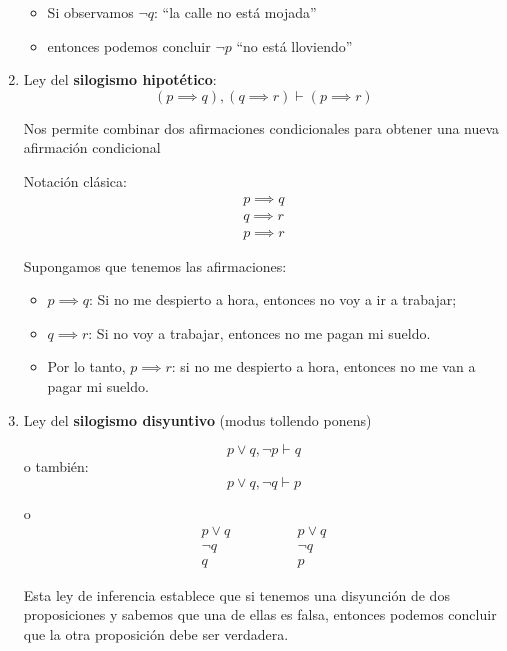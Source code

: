 \begin{enumerate}[label=\alph*)]
\begin{fmd-example}
		\begin{itemize}
			\item Si observamos $\neg q$: ``la calle no está mojada''
			\item entonces podemos concluir $\neg p$ ``no está lloviendo''
		\end{itemize}
	\end{fmd-example}
	
	\item Ley del \textbf{silogismo hipotético}: 
	\[ (p \implies q), (q \implies r) \vdash \left( p \implies r \right)  \]
	
	Nos permite combinar dos afirmaciones condicionales para obtener una nueva afirmación condicional
	
	Notación clásica:
	\[
	\begin{array}{l}
		p  \implies q\\
		q \implies r \\ \hline
		p \implies r
	\end{array}
	\]
	\begin{fmd-example}
		Supongamos que tenemos las afirmaciones:
		\begin{itemize}
			\item $p \implies q$: Si no me despierto a hora, entonces no voy a ir a trabajar;
			\item $q \implies r$: Si no voy a trabajar, entonces no me pagan mi sueldo.
			\item Por lo tanto, $p \implies r$: si no me despierto a hora, entonces no me van a pagar mi sueldo.
		\end{itemize}
	\end{fmd-example}
	
	\item Ley del \textbf{silogismo disyuntivo} (modus tollendo ponens)
	
	\[ p \lor q, \neg p \vdash q \]
	o también:
	\[ p \lor q, \neg q \vdash p \]
	
	o
	\[
	\begin{array}{l}
		p  \lor q\\
		\neg q \\ \hline
		q
	\end{array} \qquad \qquad \begin{array}{l}
	p  \lor q\\
	\neg q \\ \hline
	p
	\end{array}
	\]
	
	Esta ley de inferencia establece que si tenemos una disyunción de dos proposiciones y sabemos que una de ellas es falsa, entonces podemos concluir que la otra proposición debe ser verdadera.
	

\end{enumerate}
